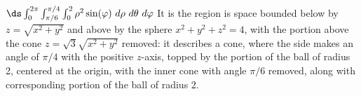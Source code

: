 {
$\ds \int_0^{2\pi}\int_{\pi/6}^{\pi/4}\int_0^{2} \rho^2\sin(\varphi)\ d\rho\ d\theta\ d\varphi$
}
{It is the region is space bounded below by $z=\sqrt{x^2+y^2}$ and above by the sphere $x^2+y^2+z^2=4$, with the portion above the cone $z=\sqrt3\sqrt{x^2+y^2}$ removed: it describes a cone, where the side makes an angle of $\pi/4$ with the positive $z$-axis, topped by the portion of the ball of radius 2, centered at the origin, with the inner cone with angle $\pi/6$ removed, along with corresponding portion of the ball of radius 2. 
}
